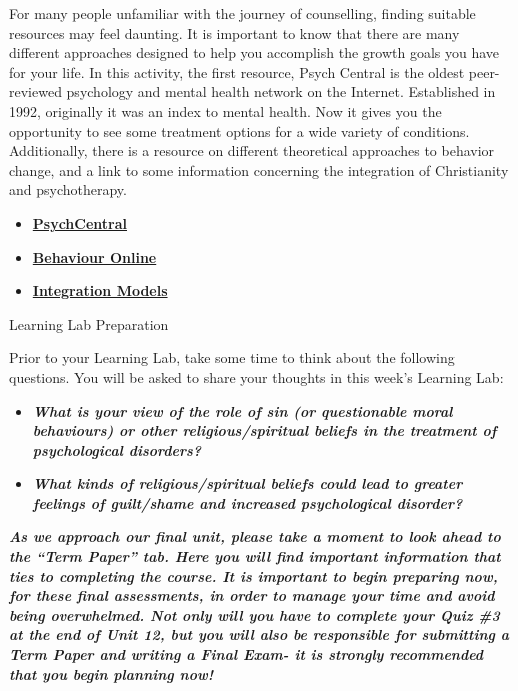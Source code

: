 \documentclass[
]{book}
\providecommand{\tightlist}{%
  \setlength{\itemsep}{0pt}\setlength{\parskip}{0pt}}
\begin{document}
\begin{reflect}
For many people unfamiliar with the journey of counselling, finding suitable resources may feel daunting. It is important to know that there are many different approaches designed to help you accomplish the growth goals you have for your life. In this activity, the first resource, Psych Central is the oldest peer-reviewed psychology and mental health network on the Internet. Established in 1992, originally it was an index to mental health. Now it gives you the opportunity to see some treatment options for a wide variety of conditions. Additionally, there is a resource on different theoretical approaches to behavior change, and a link to some information concerning the integration of Christianity and psychotherapy.

\begin{itemize}
\tightlist
\item
  \href{https://psychcentral.com/}{\textbf{PsychCentral}}\\
\item
  \href{http://www.behavior.net}{\textbf{Behaviour Online}}\\
\item
  \href{http://www.psyche.gr/lpsycrel.htm}{\textbf{Integration Models}}
\end{itemize}

{Learning Lab Preparation}

Prior to your Learning Lab, take some time to think about the following questions. You will be asked to share your thoughts in this week's Learning Lab:

\begin{itemize}
\tightlist
\item
  \textbf{\emph{What is your view of the role of sin (or questionable moral behaviours) or other religious/spiritual beliefs in the treatment of psychological disorders?}}\\
\item
  \textbf{\emph{What kinds of religious/spiritual beliefs could lead to greater feelings of guilt/shame and increased psychological disorder?}}
\end{itemize}

\textbf{\emph{As we approach our final unit, please take a moment to look ahead to the ``Term Paper'' tab. Here you will find important information that ties to completing the course. It is important to begin preparing now, for these final assessments, in order to manage your time and avoid being overwhelmed. Not only will you have to complete your Quiz \#3 at the end of Unit 12, but you will also be responsible for submitting a Term Paper and writing a Final Exam- it is strongly recommended that you begin planning now!}}
\end{reflect}
\end{document}
